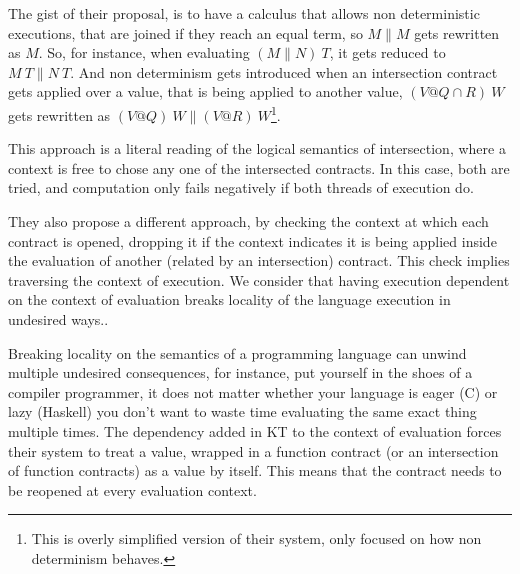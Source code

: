 

The gist of their proposal, is to have a calculus that allows non deterministic
executions, that are joined if they reach an equal term, so $M \parallel M$ gets
rewritten as $M$.
So, for instance, when evaluating $(M \parallel N) ~ T$, it gets
reduced to $ M ~ T \parallel N ~ T$.
And non determinism gets introduced when an intersection contract gets applied
over a value, that is being applied to another value, $(V @ Q \cap R) ~ W$
gets rewritten as $(V @ Q) ~ W \parallel (V @ R) ~ W$\footnote{This is overly
simplified version of their system, only focused on how non determinism behaves.}.

This approach is a literal reading of the logical semantics of intersection, where
a context is free to chose any one of the intersected contracts.
In this case, both are tried, and computation only fails negatively if both
threads of execution do.

They also propose a different approach, by checking the context at which
each contract is opened, dropping
it if the context indicates it is being applied inside the evaluation of another
(related by an intersection) contract.
This check implies traversing the context of execution.
We consider that having execution dependent on the context
of evaluation breaks locality of
the language execution in undesired ways..

Breaking locality on the semantics of a programming language can unwind
multiple undesired consequences, for instance, put yourself in the shoes
of a compiler programmer, it does not matter whether your language is eager
(C) or lazy (Haskell) you don't want to waste time evaluating
the same exact thing multiple times.
The dependency added in KT to the context of evaluation forces their system
to treat a value, wrapped in a function contract (or an intersection of function
contracts) as a value by itself. This means that the contract needs to be reopened
at every evaluation context.

